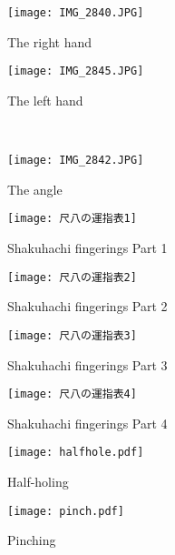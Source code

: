 
\begin{figure}[H]
	\centering
	\begin{minipage}{0.4\textwidth}
	\centering
	\texttt{[image: IMG\_2840.JPG]}
	\caption{The right hand}
	\label{fig:right_hand_position}
	\end{minipage}
	\hfill
	\begin{minipage}{0.4\textwidth}
	\centering
	\vspace{1cm}
	\texttt{[image: IMG\_2845.JPG]}
	\caption{The left hand}
	\label{fig:left_hand_position}
	\end{minipage}
	\\
	\centering
	\begin{minipage}{0.4\textwidth}
	\centering
	\texttt{[image: IMG\_2842.JPG]}
	\caption{The angle}
	\label{fig:angle}
	\end{minipage}
	\hfill*

\end{figure}

\begin{figure}[H]
	\centering
	\texttt{[image: 尺八の運指表1]}
	\caption{Shakuhachi fingerings Part 1}
	\label{fig:shakuhachi_fingerings_1}
\end{figure}

\begin{figure}[H]
	\centering
	\texttt{[image: 尺八の運指表2]}
	\caption{Shakuhachi fingerings Part 2}
	\label{fig:shakuhachi_fingerings_2}
\end{figure}

\begin{figure}[H]
	\centering
	\texttt{[image: 尺八の運指表3]}
	\caption{Shakuhachi fingerings Part 3}
	\label{fig:shakuhachi_fingerings_3}
\end{figure}

\begin{figure}[H]
	\centering
	\texttt{[image: 尺八の運指表4]}
	\caption{Shakuhachi fingerings Part 4}
	\label{fig:shakuhachi_fingerings_4}
\end{figure}

\vfill

\begin{figure}
	\centering
	\begin{minipage}{0.9\textwidth}
	\centering
	\texttt{[image: halfhole.pdf]}
	\caption{Half-holing} \label{fig:half-holing}
	\texttt{[image: pinch.pdf]}
	\caption{Pinching} \label{fig:pinching}
	\end{minipage}
\end{figure}
